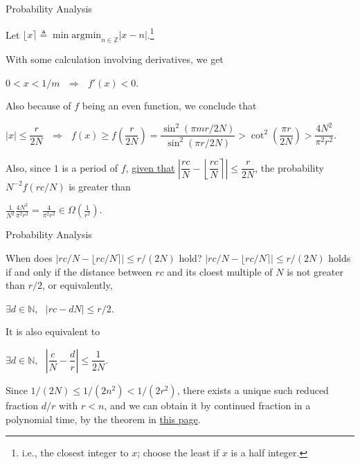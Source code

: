 \documentclass{beamer}
\newcommand{\mbb}[1]{\mathbb{#1}}
\newcommand{\mrm}[1]{\mathrm{#1}}
\renewcommand{\ul}[1]{\underline{#1}}
\renewcommand{\:}{\text{ }}
\begin{document}
    \begin{frame}{Probability Analysis}
        \centerline{Let $\lfloor x \rceil \triangleq \min \mrm{argmin}_{n \in \mbb{Z}} |x - n|$.\footnote{i.e., the closest integer to $x$; choose the least if $x$ is a half integer.}}
        \begin{block}{}
            \small
            With some calculation involving derivatives, we get \\[.5em]
            \centerline{$0 < x < 1/m \:\Longrightarrow\: f'(x) < 0$.} \vspace*{.5em}
            Also because of $f$ being an even function, we conclude that \\[.5em]
            \centerline{$|x| \leq \dfrac{r}{2N} \:\Longrightarrow\: f(x) \geq f\left( \dfrac{r}{2N} \right) = \dfrac{\sin^2(\pi mr/2N)}{\sin^2(\pi r / 2N)} > \cot^2(\dfrac{\pi r}{2N}) > \dfrac{4N^2}{\pi^2 r^2}$.} \vspace*{.5em}
            Also, since $1$ is a period of $f$, \ul{given that} $\left| \dfrac{rc}{N} - \left\lfloor \dfrac{rc}{N} \right\rceil \right| \leq \dfrac{r}{2N}$,
            the probability $N^{-2}f(rc/N)$ is greater than \\[.5em]
            \centerline{$\displaystyle \frac{1}{N^2}\frac{4N^2}{\pi^2 r^2} = \frac{4}{\pi^2 r^2} \in \Omega \left( \frac{1}{r^2} \right)$.}
        \end{block}
    \end{frame}

    \begin{frame}{Probability Analysis}
        \begin{block}{When does $\big| rc/N - \lfloor rc/N \rceil \big| \leq r/(2N)$ hold?}
            \small
            $\big| rc/N - \lfloor rc/N \rceil \big| \leq r/(2N)$ holds if and only if 
            the distance between $rc$ and its cloest multiple of $N$ is not greater than $r/2$, or equivalently, \\[.5em]
            \centerline{$\exists d \in \mbb{N},\: |rc-dN| \leq r/2$.} \vspace*{.5em}
            It is also equivalent to \\[.5em]
            \centerline{$\exists d \in \mbb{N},\: \left| \dfrac{c}{N} - \dfrac{d}{r} \right| \leq \dfrac{1}{2N}$.} \vspace*{.5em}
            Since $1/(2N) \leq 1/(2n^2) < 1/(2r^2)$, there exists a unique such reduced fraction $d/r$ with $r < n$,
            and we can obtain it by continued fraction in a polynomial time, by the theorem in \hyperlink{convergent}{\color{blue}this page}.
        \end{block}
    \end{frame}
\end{document}
